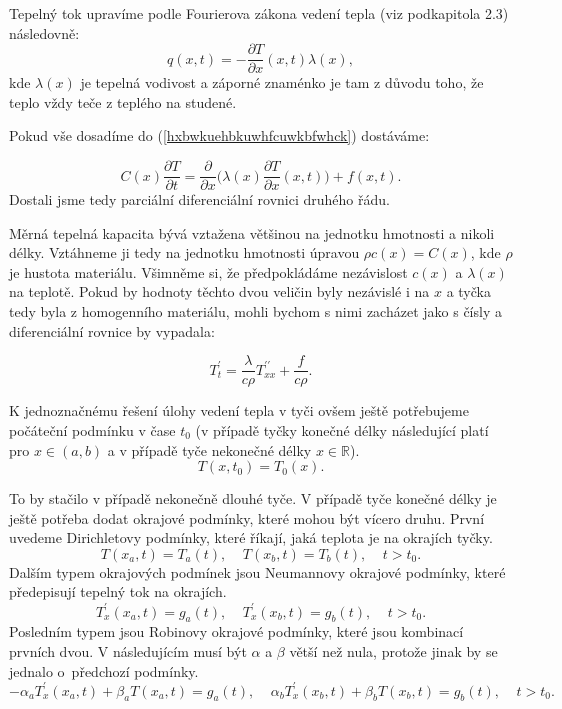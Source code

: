 Tepelný tok upravíme podle Fourierova zákona vedení tepla (viz podkapitola 2.3) následovně:
\begin{equation}
q(x,t)=-\frac{\partial T}{\partial x}(x,t)\lambda(x),
\end{equation}
kde $\lambda(x)$ je tepelná vodivost a záporné znaménko je tam z důvodu toho, že teplo vždy teče z teplého na studené.

Pokud vše dosadíme do (\ref{hxbwkuehbkuwhfcuwkbfwhck}) dostáváme:

\begin{equation}
C(x) \frac{\partial T}{\partial t}=\frac{\partial }{\partial x} \bigg(\lambda(x)\frac{\partial T}{\partial x}(x,t)\bigg)+f(x,t).
\end{equation}
Dostali jsme tedy parciální diferenciální rovnici druhého řádu.

Měrná tepelná kapacita bývá vztažena většinou na jednotku hmotnosti a nikoli délky. Vztáhneme ji tedy na jednotku hmotnosti úpravou $\rho c(x)=C(x)$, kde $\rho$ je hustota materiálu. Všimněme si, že předpokládáme nezávislost $c(x)$ a $\lambda(x)$ na teplotě. Pokud by hodnoty těchto dvou veličin byly nezávislé i na $x$ a tyčka tedy byla z homogenního materiálu, mohli bychom s nimi zacházet jako s čísly a diferenciální rovnice by vypadala: 

\begin{equation} T^\prime_t=\frac{\lambda}{ c\rho} T^{\prime\prime}_{xx}+\frac{f}{ c\rho}.
\end{equation}

K jednoznačnému řešení úlohy vedení tepla v tyči ovšem ještě potřebujeme počáteční podmínku v čase $t_0$ (v případě tyčky konečné délky následující platí pro $x\in (a,b)$ a v případě tyče nekonečné délky $x\in \mathbb{R}$).
\begin{equation} 
T(x,t_0)=T_0 (x).
\end{equation}

To by stačilo v případě nekonečně dlouhé tyče. V případě tyče konečné délky je ještě potřeba dodat okrajové podmínky, které mohou být vícero druhu. První uvedeme Dirichletovy podmínky, které říkají, jaká teplota je na okrajích tyčky.
\begin{equation}
T(x_a,t)=T_a(t), \ \ \ \ \ 
T(x_b,t)=T_b(t),  \ \ \ \ \   t>t_0.
\end{equation}
Dalším typem okrajových podmínek jsou Neumannovy okrajové podmínky, které předepisují tepelný tok na okrajích.
\begin{equation}
T^\prime_x(x_a,t)=g_a(t),  \ \ \ \ \
T^\prime_x(x_b,t)=g_b(t), \ \ \ \ \      t>t_0.
\end{equation}
Posledním typem jsou Robinovy okrajové podmínky, které jsou kombinací prvních dvou. V následujícím musí být $\alpha$ a $\beta$ větší než nula, protože jinak by se jednalo \mbox{o předchozí} podmínky.
\begin{equation}
-\alpha_a T^\prime_x(x_a,t)+\beta_a T(x_a,t)=g_a(t), \ \ \ \ \
\alpha_b T^\prime_x(x_b,t)+\beta_b T(x_b,t)=g_b(t),\ \ \ \ \   t>t_0.
\end{equation}

